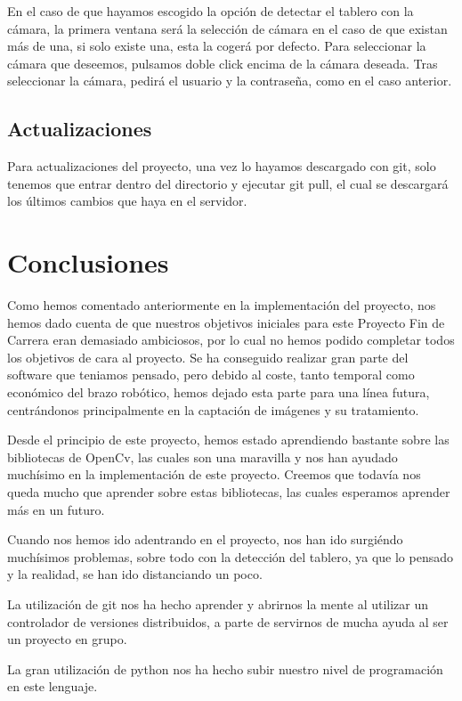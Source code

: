\documentclass[12pt,a4paper]{report}
\begin{document}
En el caso de que hayamos escogido la opción de detectar el tablero con la
cámara, la primera ventana será la selección de cámara en el caso de que existan
más de una, si solo existe una, esta la cogerá por defecto. Para seleccionar la
cámara que deseemos, pulsamos doble click encima de la cámara deseada.  Tras
seleccionar la cámara, pedirá el usuario y la contraseña, como en el caso
anterior. 


\section{Actualizaciones}

Para actualizaciones del proyecto, una vez lo hayamos descargado con git, solo
tenemos que entrar dentro del directorio y ejecutar git pull, el cual se
descargará los últimos cambios que haya en el servidor. 


\chapter{Conclusiones}

Como hemos comentado anteriormente en la implementación del proyecto, nos hemos
dado cuenta de que nuestros objetivos iniciales para este Proyecto Fin de
Carrera eran demasiado ambiciosos, por lo cual no hemos podido completar todos
los objetivos de cara al proyecto. Se ha conseguido realizar gran parte del
software que teniamos pensado, pero debido al coste, tanto temporal como
económico del brazo robótico, hemos dejado esta parte para una línea futura,
centrándonos principalmente en la captación de imágenes y su tratamiento.

Desde el principio de este proyecto, hemos estado aprendiendo bastante sobre las
bibliotecas de OpenCv, las cuales son una maravilla y nos han ayudado muchísimo en
la implementación de este proyecto. Creemos que todavía nos queda mucho que
aprender sobre estas bibliotecas, las cuales esperamos aprender más en un futuro. 

Cuando nos hemos ido adentrando en el proyecto, nos han ido surgiéndo muchísimos
problemas, sobre todo con la detección del tablero, ya que lo pensado y la
realidad, se han ido distanciando un poco. 

La utilización de git nos ha hecho aprender y abrirnos la mente al utilizar un
controlador de versiones distribuidos, a parte de servirnos de mucha ayuda al
ser un proyecto en grupo. 

La gran utilización de python nos ha hecho subir nuestro nivel de programación
en este lenguaje.
\end{document}
